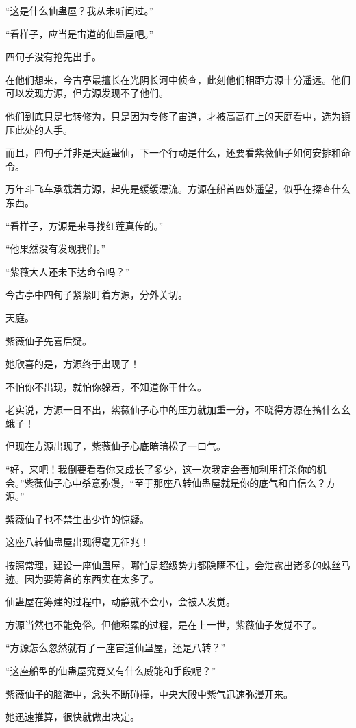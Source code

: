\begin{this_body}
“这是什么仙蛊屋？我从未听闻过。”

“看样子，应当是宙道的仙蛊屋吧。”

四旬子没有抢先出手。

在他们想来，今古亭最擅长在光阴长河中侦查，此刻他们相距方源十分遥远。他们可以发现方源，但方源发现不了他们。

他们到底只是七转修为，只是因为专修了宙道，才被高高在上的天庭看中，选为镇压此处的人手。

而且，四旬子并非是天庭蛊仙，下一个行动是什么，还要看紫薇仙子如何安排和命令。

万年斗飞车承载着方源，起先是缓缓漂流。方源在船首四处遥望，似乎在探查什么东西。

“看样子，方源是来寻找红莲真传的。”

“他果然没有发现我们。”

“紫薇大人还未下达命令吗？”

今古亭中四旬子紧紧盯着方源，分外关切。

天庭。

紫薇仙子先喜后疑。

她欣喜的是，方源终于出现了！

不怕你不出现，就怕你躲着，不知道你干什么。

老实说，方源一日不出，紫薇仙子心中的压力就加重一分，不晓得方源在搞什么幺蛾子！

但现在方源出现了，紫薇仙子心底暗暗松了一口气。

“好，来吧！我倒要看看你又成长了多少，这一次我定会善加利用打杀你的机会。”紫薇仙子心中杀意弥漫，“至于那座八转仙蛊屋就是你的底气和自信么？方源。”

紫薇仙子也不禁生出少许的惊疑。

这座八转仙蛊屋出现得毫无征兆！

按照常理，建设一座仙蛊屋，哪怕是超级势力都隐瞒不住，会泄露出诸多的蛛丝马迹。因为要筹备的东西实在太多了。

仙蛊屋在筹建的过程中，动静就不会小，会被人发觉。

方源当然也不能免俗。但他积累的过程，是在上一世，紫薇仙子发觉不了。

“方源怎么忽然就有了一座宙道仙蛊屋，还是八转？”

“这座船型的仙蛊屋究竟又有什么威能和手段呢？”

紫薇仙子的脑海中，念头不断碰撞，中央大殿中紫气迅速弥漫开来。

她迅速推算，很快就做出决定。


\end{this_body}
